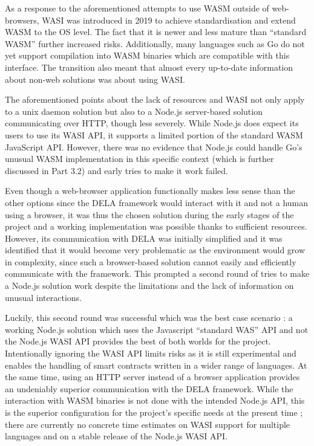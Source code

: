 \documentclass[11pt, a4paper, twoside, openright]{article}
\begin{document}
As a response to the aforementioned attempts to use WASM outside of web-browsers, WASI was introduced in 2019 to achieve standardisation and extend WASM to the OS level. The fact that it is newer and less mature than ``standard WASM'' further increased risks. Additionally, many languages such as Go do not yet support compilation into WASM binaries which are compatible with this interface. The transition also meant that almost every up-to-date information about non-web solutions was about using WASI.

The aforementioned points about the lack of resources and WASI not only apply to a unix daemon solution but also to a Node.js server-based solution communicating over HTTP, though less severely. While Node.js does expect its users to use its WASI API, it supports a limited portion of the standard WASM JavaScript API. However, there was no evidence that Node.js could handle Go's unusual WASM implementation in this specific context (which is further discussed in Part 3.2) and early tries to make it work failed.

Even though a web-browser application functionally makes less sense than the other options since the DELA framework would interact with it and not a human using a browser, it was thus the chosen solution during the early stages of the project and a working implementation was possible thanks to sufficient resources. However, its communication with DELA was initially simplified and it was identified that it would become very problematic as the environment would grow in complexity, since such a browser-based solution cannot easily and efficiently communicate with the framework. This prompted a second round of tries to make a Node.js solution work despite the limitations and the lack of information on unusual interactions.

Luckily, this second round was successful which was the best case scenario : a working Node.js solution which uses the Javascript ``standard WAS'' API and not the Node.js WASI API provides the best of both worlds for the project. Intentionally ignoring the WASI API limits risks as it is still experimental and enables the handling of smart contracts written in a wider range of languages. At the same time, using an HTTP server instead of a browser application provides an undeniably superior communication with the DELA framework. While the interaction with WASM binaries is not done with the intended Node.js API, this is the superior configuration for the project's specific needs at the present time ; there are currently no concrete time estimates on WASI support for multiple languages and on a stable release of the Node.js WASI API.
\end{document}
